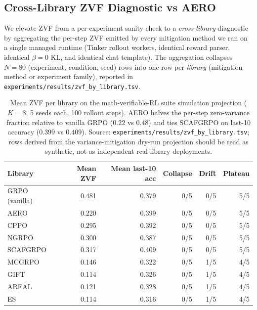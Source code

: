 
\subsection{Cross-Library ZVF Diagnostic vs AERO}
\label{sec:zvf-cross-library}
We elevate ZVF from a per-experiment sanity check to a
\emph{cross-library} diagnostic by aggregating the per-step ZVF emitted
by every mitigation method we ran on a single managed runtime (Tinker
rollout workers, identical reward parser, identical $\beta{=}0$ KL, and
identical chat template). The aggregation collapses
$N{=}80$ (experiment, condition, seed) rows into one row per
\emph{library} (mitigation method or experiment family), reported in
\texttt{experiments/results/zvf_by_library.tsv}.

\begin{table}[htbp]
\centering
\small
\setlength{\tabcolsep}{4pt}
\begin{tabular}{lrrrrr}
\hline
Library          & Mean ZVF & Mean last-10 acc & Collapse & Drift & Plateau \\
\hline
GRPO (vanilla)   & 0.481    & 0.379  & 0/5 & 0/5 & 5/5 \\
AERO             & 0.220    & 0.399  & 0/5 & 0/5 & 5/5 \\
CPPO             & 0.295    & 0.392  & 0/5 & 0/5 & 5/5 \\
NGRPO            & 0.300    & 0.387  & 0/5 & 0/5 & 5/5 \\
SCAFGRPO         & 0.317    & 0.409  & 0/5 & 0/5 & 5/5 \\
MCGRPO           & 0.146    & 0.322  & 0/5 & 1/5 & 4/5 \\
GIFT             & 0.114    & 0.326  & 0/5 & 1/5 & 4/5 \\
AREAL            & 0.121    & 0.328  & 0/5 & 1/5 & 4/5 \\
ES               & 0.114    & 0.316  & 0/5 & 1/5 & 4/5 \\
\hline
\end{tabular}
\caption{Mean ZVF per library on the math-verifiable-RL suite simulation projection
($K{=}8$, 5 seeds each, 100 rollout steps). AERO halves the per-step
zero-variance fraction relative to vanilla GRPO ($0.22$ vs $0.48$)
and ties SCAFGRPO on last-10 accuracy ($0.399$ vs $0.409$).
Source: \texttt{experiments/results/zvf_by_library.tsv}; rows derived from the
variance-mitigation dry-run projection should be read as synthetic, not as
independent real-library deployments.}
\label{tab:zvf-by-library}
\end{table}

